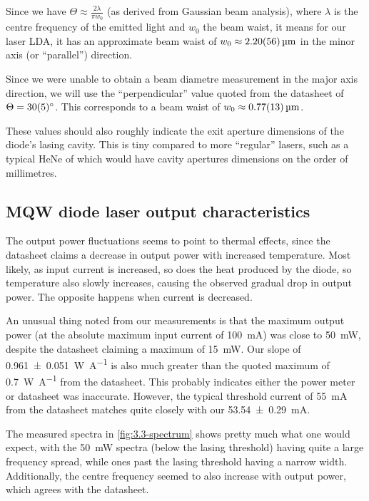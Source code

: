 \documentclass[a4paper]{scrartcl}
\begin{document}
Since we have \(\Theta \approx \frac{2 \lambda}{\pi w_0}\) (as derived from Gaussian beam analysis), where \(\lambda\) is the centre frequency of the emitted light and \(w_0\) the beam waist, it means for our laser LDA, it has an approximate beam waist of \(w_0 \approx \SI{2.20 \pm 0.56}{\micro\metre}\) in the minor axis (or ``parallel'') direction.

Since we were unable to obtain a beam diametre measurement in the major axis direction, we will use the ``perpendicular'' value quoted from the datasheet of \(\Theta = \SI{30 \pm 5}{\degree}\). This corresponds to a beam waist of \(w_0 \approx \SI{0.77 \pm 0.13}{\micro\metre}\).

These values should also roughly indicate the exit aperture dimensions of the diode's lasing cavity. This is tiny compared to more ``regular'' lasers, such as a typical HeNe of which would have cavity apertures dimensions on the order of millimetres.

\subsection{MQW diode laser output characteristics}
The output power fluctuations seems to point to thermal effects, since the datasheet claims a decrease in output power with increased temperature. Most likely, as input current is increased, so does the heat produced by the diode, so temperature also slowly increases, causing the observed gradual drop in output power. The opposite happens when current is decreased.

An unusual thing noted from our measurements is that the maximum output power (at the absolute maximum input current of \SI{100}{\milli\ampere}) was close to \SI{50}{\milli\watt}, despite the datasheet claiming a maximum of \SI{15}{\milli\watt}. Our slope of \SI{0.961 \pm 0.051}{\watt\per\ampere} is also much greater than the quoted maximum of \SI{0.7}{\watt\per\ampere} from the datasheet. This probably indicates either the power meter or datasheet was inaccurate. However, the typical threshold current of \SI{55}{\milli\ampere} from the datasheet matches quite closely with our \SI{53.54 \pm 0.29}{\milli\ampere}.

The measured spectra in \ref{fig:3.3-spectrum} shows pretty much what one would expect, with the \SI{50}{\milli\watt} spectra (below the lasing threshold) having quite a large frequency spread, while ones past the lasing threshold having a narrow width. Additionally, the centre frequency seemed to also increase with output power, which agrees with the datasheet.
\end{document}
